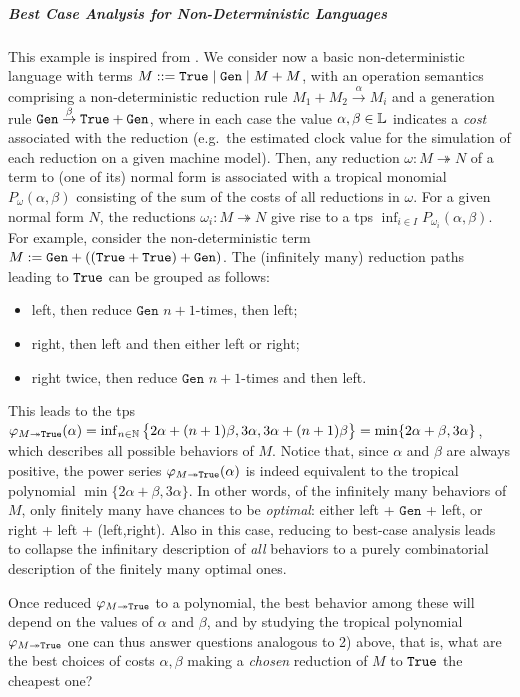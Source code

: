 \subparagraph*{Best Case Analysis for Non-Deterministic Languages}

This example is inspired from \cite{Manzo2013}. We consider now a basic non-deterministic language with terms $M::= \mathtt{True} \mid  \mathtt{Gen} \mid  M + M$, with an operation semantics comprising a non-deterministic reduction rule 
$M_{1}+M_{2} \stackrel{\alpha}{\to} M_{i}$ and a generation rule
$\mathtt{Gen}\stackrel{\beta}{\to} \mathtt{True} +\mathtt{Gen}$, 
where in each case the value $\alpha,\beta\in \mathbb{L}$ indicates a \emph{cost} associated with the reduction (e.g.~the estimated clock value for the simulation of each reduction on a given machine model). 
Then, any reduction $\omega: M \twoheadrightarrow N$ of a term to (one of its) normal form is  associated with a tropical monomial $P_{\omega}( \alpha,\beta)$ consisting of the sum of the costs of all reductions in $\omega$. For a given normal form $N$, the reductions $\omega_{i}: M \twoheadrightarrow N$ give rise to a tps $\inf_{i\in I}P_{\omega_{i}}( \alpha,\beta)$. 
For example, consider the non-deterministic term
$
M :=\mathtt{Gen}+  ((\mathtt{True} + \mathtt{True}) + \mathtt{Gen})
$. 
The (infinitely many) reduction paths leading to $\mathtt{True}$ can be grouped as follows:
\begin{itemize}
\item left, then reduce $\mathtt{Gen}$ $n+1$-times, then left;
\item right, then left and then either left or right;
\item right twice, then reduce $\mathtt{Gen}$ $n+1$-times and then left.
\end{itemize}
This leads to the tps 
$\varphi_{M\twoheadrightarrow \mathtt{True}}(\alpha)=\inf_{n\in \mathbb N}\big\{2\alpha+(n+1)\beta, 3\alpha, 3\alpha+(n+1)\beta\big \}= \min\{ 2\alpha+\beta, 3\alpha\}$, which describes all possible behaviors of $M$. Notice that, since $\alpha$ and $\beta$ are always positive, the power series $\varphi_{M\twoheadrightarrow\mathtt{True}}(\alpha)$ is indeed equivalent to the tropical polynomial $\min\{ 2\alpha+\beta, 3\alpha\}$. In other words, of the infinitely many behaviors of $M$, only finitely many have chances to be \emph{optimal}: either left + $\mathtt{Gen}$ + left, or right + left + (left,right). Also in this case, reducing to best-case analysis leads to collapse the infinitary description of \emph{all} behaviors to a purely combinatorial description of the finitely many optimal ones. 

Once reduced $\varphi_{M\twoheadrightarrow\mathtt{True}}$ to a polynomial, the best behavior among these will depend on the values of $\alpha$ and $\beta$, and by studying the tropical polynomial $\varphi_{M\twoheadrightarrow\mathtt{True}}$ one can thus answer questions analogous to 2) above, that is, what are the best choices of costs $\alpha,\beta$ making a \emph{chosen} reduction of $M$ to $\mathtt{True}$ the cheapest one?



















